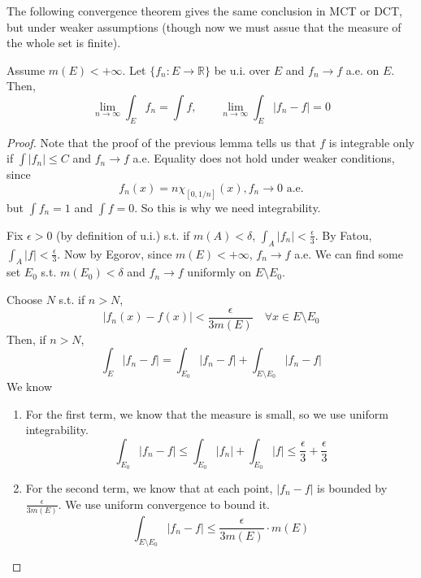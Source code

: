   The following convergence theorem gives the same conclusion in MCT or DCT, but under weaker assumptions (though now we must assue that the measure of the whole set is finite). 

  \begin{theorem}
    Assume $m(E) < +\infty$. Let $\{f_n: E \to \mathbb{R}\}$ be u.i. over $E$ and $f_n \to f$ a.e. on $E$. Then, 
    \begin{equation}
      \lim_{n \to \infty} \int_E f_n = \int f, \qquad \lim_{n \to \infty} \int_E |f_n - f| = 0
    \end{equation}
  \end{theorem}
  \begin{proof}
    Note that the proof of the previous lemma tells us that $f$ is integrable only if $\int |f_n| \leq C$ and $f_n \to f$ a.e. Equality does not hold under weaker conditions, since 
    \begin{equation}
      f_n (x) = n \chi_{[0, 1/n]} (x), f_n \to 0 \text{ a.e.}
    \end{equation}
    but $\int f_n = 1$ and $\int f = 0$. So this is why we need integrability. 

    Fix $\epsilon > 0$ (by definition of u.i.) s.t. if $m(A) < \delta$, $\int_A |f_n| < \frac{\epsilon}{3}$. By Fatou, $\int_A |f| < \frac{\epsilon}{3}$. Now by Egorov, since $m(E) < +\infty$, $f_n \to f$ a.e. We can find some set $E_0$ s.t. $m(E_0) < \delta$ and $f_n \to f$ uniformly on $E \setminus E_0$. 

    Choose $N$ s.t. if $n > N$, 
    \begin{equation}
      |f_n (x) - f(x)| < \frac{\epsilon}{3 m(E)} \quad \forall x \in E \setminus E_0
    \end{equation}
    Then, if $n > N$, 
    \begin{equation}
      \int_E |f_n - f| = \int_{E_0} |f_n - f| + \int_{E \setminus E_0} |f_n - f|
    \end{equation}
    We know 
    \begin{enumerate}
      \item For the first term, we know that the measure is small, so we use uniform integrability. 
      \begin{equation}
        \int_{E_0} |f_n - f| \leq \int_{E_0} |f_n| + \int_{E_0} |f| \leq \frac{\epsilon}{3} + \frac{\epsilon}{3} 
      \end{equation}

      \item For the second term, we know that at each point, $|f_n - f|$ is bounded by $\frac{\epsilon}{3 m(E)}$. We use uniform convergence to bound it. 
      \begin{equation}
        \int_{E \setminus E_0} |f_n - f| \leq \frac{\epsilon}{3 m(E)} \cdot m(E)
      \end{equation}
    \end{enumerate}
  \end{proof}

